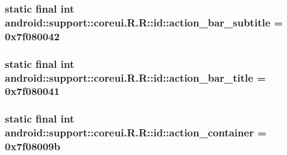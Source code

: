 \hypertarget{classandroid_1_1support_1_1coreui_1_1_r_1_1id_401e549a1c82535c78ef49c39137bf19}{
\subsubsection[{action\_\-bar\_\-subtitle}]{\setlength{\rightskip}{0pt plus 5cm}static final int android::support::coreui.R.R::id::action\_\-bar\_\-subtitle = 0x7f080042}}
\label{classandroid_1_1support_1_1coreui_1_1_r_1_1id_401e549a1c82535c78ef49c39137bf19}


\hypertarget{classandroid_1_1support_1_1coreui_1_1_r_1_1id_36b0ddcb9be9de42581838a1a78d37eb}{
\subsubsection[{action\_\-bar\_\-title}]{\setlength{\rightskip}{0pt plus 5cm}static final int android::support::coreui.R.R::id::action\_\-bar\_\-title = 0x7f080041}}
\label{classandroid_1_1support_1_1coreui_1_1_r_1_1id_36b0ddcb9be9de42581838a1a78d37eb}


\hypertarget{classandroid_1_1support_1_1coreui_1_1_r_1_1id_1b479ffc9017c935dbefefdb2d4ea6bb}{
\subsubsection[{action\_\-container}]{\setlength{\rightskip}{0pt plus 5cm}static final int android::support::coreui.R.R::id::action\_\-container = 0x7f08009b}}
\label{classandroid_1_1support_1_1coreui_1_1_r_1_1id_1b479ffc9017c935dbefefdb2d4ea6bb}


